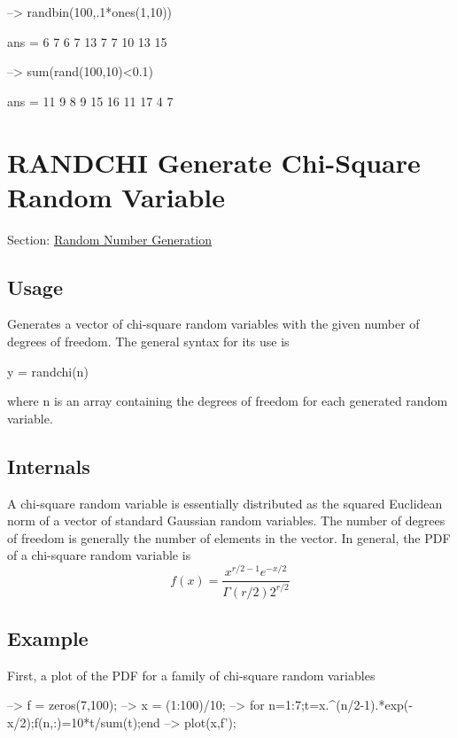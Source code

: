 \begin{DoxyVerbInclude}
--> randbin(100,.1*ones(1,10))

ans = 
  6  7  6  7 13  7  7 10 13 15 

--> sum(rand(100,10)<0.1)

ans = 
 11  9  8  9 15 16 11 17  4  7 
\end{DoxyVerbInclude}
 \hypertarget{random_randchi}{}\section{R\-A\-N\-D\-C\-H\-I Generate Chi-\/\-Square Random Variable}\label{random_randchi}
Section\-: \hyperlink{sec_random}{Random Number Generation} \hypertarget{vtkwidgets_vtkxyplotwidget_Usage}{}\subsection{Usage}\label{vtkwidgets_vtkxyplotwidget_Usage}
Generates a vector of chi-\/square random variables with the given number of degrees of freedom. The general syntax for its use is \begin{DoxyVerb}   y = randchi(n)
\end{DoxyVerb}
 where {\ttfamily n} is an array containing the degrees of freedom for each generated random variable. \hypertarget{transforms_svd_Function}{}\subsection{Internals}\label{transforms_svd_Function}
A chi-\/square random variable is essentially distributed as the squared Euclidean norm of a vector of standard Gaussian random variables. The number of degrees of freedom is generally the number of elements in the vector. In general, the P\-D\-F of a chi-\/square random variable is \[ f(x) = \frac{x^{r/2-1}e^{-x/2}}{\Gamma(r/2)2^{r/2}} \] \hypertarget{variables_struct_Example}{}\subsection{Example}\label{variables_struct_Example}
First, a plot of the P\-D\-F for a family of chi-\/square random variables


\begin{DoxyVerbInclude}
--> f = zeros(7,100);
--> x = (1:100)/10;
--> for n=1:7;t=x.^(n/2-1).*exp(-x/2);f(n,:)=10*t/sum(t);end
--> plot(x,f');
\end{DoxyVerbInclude}


